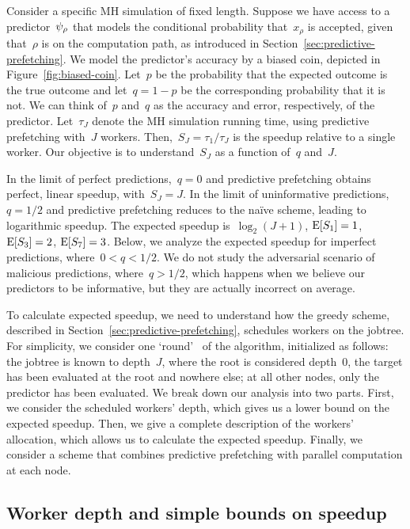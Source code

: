 \documentclass[angelino.tex]{subfiles}
\begin{document}
Consider a specific MH simulation of fixed length.
Suppose we have access to a predictor~$\psi_{\rho}$ that models the
conditional probability that~$x_\rho$ is accepted, given that~$\rho$ is on the 
computation path, as introduced in Section~\ref{sec:predictive-prefetching}.
%
We model the predictor's accuracy by a biased coin, depicted in
Figure~\ref{fig:biased-coin}.
Let~$p$ be the probability that the expected outcome is the true outcome
and let~${q = 1-p}$ be the corresponding probability that it is not.
We can think of~$p$ and~$q$ as the accuracy and error, respectively,
of the predictor.
%
Let~$\tau_J$ denote the MH simulation running time, using predictive prefetching 
with~$J$ workers. 
Then,~${S_J = \tau_1 / \tau_J}$ is the speedup relative to a single worker.
Our objective is to understand~$S_J$ as a function of~$q$ and~$J$.

In the limit of perfect predictions,~${q = 0}$ and predictive prefetching
obtains perfect, linear speedup, with~${S_J = J}$.
In the limit of uninformative predictions,~${q = 1/2}$ and predictive
prefetching reduces to the na\"ive scheme, leading to logarithmic speedup.
The expected speedup is~$\log_2 (J+1)$,
\eg ${\mbox{E}[S_1] = 1}$, ${\mbox{E}[S_3] = 2}$, ${\mbox{E}[S_7] = 3}$.
Below, we analyze the expected speedup for imperfect predictions,
where~${0 < q < 1/2}$.
We do not study the adversarial scenario of malicious predictions,
where~${q > 1/2}$, which happens when we believe our predictors to be
informative, but they are actually incorrect on average.

To calculate expected speedup, we need to understand how the greedy scheme,
described in Section~\ref{sec:predictive-prefetching}, schedules workers on the jobtree.
For simplicity, we consider one `round'~ of the algorithm, initialized as follows:
the jobtree is known to depth~$J$, where the root is considered depth~$0$,
the target has been evaluated at the root and nowhere else;
at all other nodes, only the predictor has been evaluated.
We break down our analysis into two parts.
First, we consider the scheduled workers' depth,
which gives us a lower bound on the expected speedup.
Then, we give a complete description of the workers' allocation,
which allows us to calculate the expected speedup.
Finally, we consider a scheme that combines predictive prefetching with
parallel computation at each node.


\subsection{Worker depth and simple bounds on speedup}
\label{sec:bounds}
\end{document}
